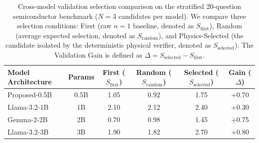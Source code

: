 \documentclass[a4paper,fleqn]{cas-sc}
\begin{document}
\begin{table}[pos=tp]
\caption{Cross-model validation selection comparison on the stratified 20-question semiconductor benchmark ($N=3$ candidates per model). We compare three selection conditions: First (raw $n=1$ baseline, denoted as $S_{\mathrm{first}}$), Random (average expected selection, denoted as $S_{\mathrm{random}}$), and Physics-Selected (the candidate isolated by the deterministic physical verifier, denoted as $S_{\mathrm{selected}}$). The Validation Gain is defined as $\Delta = S_{\mathrm{selected}} - S_{\mathrm{first}}$.}
\label{tab:model_comparison}
\centering
\begin{tabularx}{\linewidth}{@{}Lccccc@{}}
\toprule
\textbf{Model Architecture} & \textbf{Params} & \textbf{First ($S_{\mathrm{first}}$)} & \textbf{Random ($S_{\mathrm{random}}$)} & \textbf{Selected ($S_{\mathrm{selected}}$)} & \textbf{Gain ($\Delta$)} \\
\midrule
Proposed-0.5B             & 0.5B   & 1.05                 & 0.92                 & 1.75                 & +0.70              \\
Llama-3.2-1B              & 1B     & 2.10                 & 2.12                 & 2.40                 & +0.30              \\
Gemma-2-2B                & 2B     & 0.70                 & 0.98                 & 1.45                 & +0.75              \\
Llama-3.2-3B              & 3B     & 1.90                 & 1.82                 & 2.70                 & +0.80              \\
\bottomrule
\end{tabularx}
\end{table}
\end{document}
